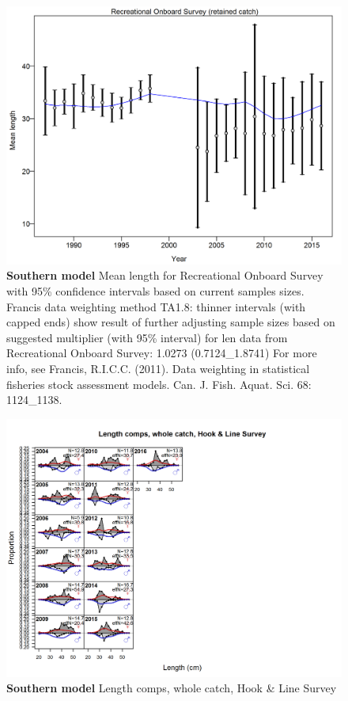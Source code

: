 \documentclass[12pt,]{article}
\begin{document}
\begin{figure}[htbp]
\centering
\includegraphics{./r4ss/plots_mod2/comp_lenfit_data_weighting_TA1.8_Recreational Onboard Survey.png}
\caption{\textbf{Southern model} Mean length for Recreational Onboard
Survey with 95\% confidence intervals based on current samples sizes.
Francis data weighting method TA1.8: thinner intervals (with capped
ends) show result of further adjusting sample sizes based on suggested
multiplier (with 95\% interval) for len data from Recreational Onboard
Survey: 1.0273 (0.7124\_1.8741) For more info, see Francis, R.I.C.C.
(2011). Data weighting in statistical fisheries stock assessment models.
Can. J. Fish. Aquat. Sci. 68: 1124\_1138.
\label{fig:mod2_12_comp_lenfit_data_weighting_TA1.8_Recreational Onboard Survey}}
\end{figure}

\begin{figure}[htbp]
\centering
\includegraphics{./r4ss/plots_mod2/comp_lenfit_flt4mkt0.png}
\caption{\textbf{Southern model} Length comps, whole catch, Hook \& Line
Survey \label{fig:mod2_13_comp_lenfit_flt4mkt0}}
\end{figure}
\end{document}
